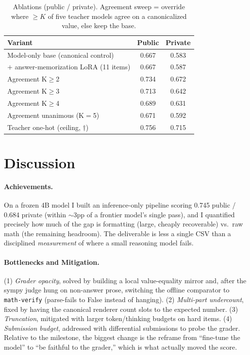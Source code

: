 \documentclass{article}
\newcommand{\new}[1]{#1}
\begin{document}
\begin{table}[h]
  \caption{Ablations (public / private). Agreement sweep = override where $\geq K$ of
  five teacher models agree on a canonicalized value, else keep the base.}
  \label{tab:abl}
  \centering
  \begin{tabular}{lcc}
    \toprule
    Variant & Public & Private \\
    \midrule
    Model-only base (canonical control)              & 0.667 & 0.583 \\
    $+$ answer-memorization LoRA (11 items)          & 0.667 & 0.587 \\
    Agreement K$\geq$2                               & 0.734 & 0.672 \\
    Agreement K$\geq$3                               & 0.713 & 0.642 \\
    Agreement K$\geq$4                               & 0.689 & 0.631 \\
    Agreement unanimous (K$=$5)                      & 0.671 & 0.592 \\
    Teacher one-hot (ceiling, $\dagger$)             & 0.756 & 0.715 \\
    \bottomrule
  \end{tabular}
\end{table}

\section{Discussion}
\label{sec:discussion}

\paragraph{Achievements.}
On a frozen 4B model I built an inference-only pipeline scoring 0.745 public / 0.684 private (within $\sim$3pp of a frontier model's single pass), and I quantified precisely how much of the gap is
formatting (large, cheaply recoverable) vs.\ raw math (the remaining headroom). The
deliverable is less a single CSV than a disciplined \emph{measurement} of where a
small reasoning model fails.

\new{
\paragraph{Bottlenecks and Mitigation.}
(1) \emph{Grader opacity}, solved by building a local value-equality mirror and,
after the sympy judge hung on non-answer prose, switching the offline comparator to
\texttt{math-verify} (parse-fails to False instead of hanging). (2) \emph{Multi-part
undercount}, fixed by having the canonical renderer count slots to the expected number.
(3) \emph{Truncation}, mitigated with larger token/thinking budgets on hard items.
(4) \emph{Submission budget}, addressed with differential submissions to probe the grader. Relative
to the milestone, the biggest change is the reframe from ``fine-tune the model'' to
``be faithful to the grader,'' which is what actually moved the score.
}
\end{document}
